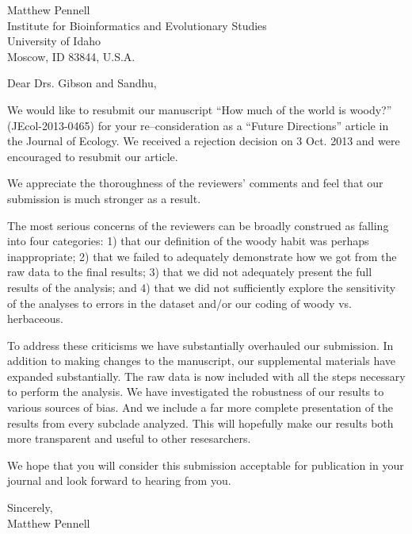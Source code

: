 \documentclass[a4paper,12pt]{article}
\begin{document}
{\raggedleft
  Matthew Pennell\\
  Institute for Bioinformatics and Evolutionary Studies\\
  University of Idaho\\
 Moscow, ID 83844, U.S.A.\\[2ex]
}

\vspace{3ex}

Dear Drs. Gibson and Sandhu,

We would like to resubmit our manuscript ``How much of the world is woody?'' (JEcol-2013-0465) 
for your re--consideration as a ``Future Directions'' article in the Journal of Ecology.
We received a rejection decision on 3 Oct. 2013 and were encouraged to resubmit our article.

We appreciate the thoroughness of the reviewers' comments and feel that our submission is much 
stronger as a result.

The most serious concerns of the reviewers can be broadly construed as falling into four categories:
1) that our definition of the woody habit was perhaps inappropriate; 2) that we failed to adequately
demonstrate how we got from the raw data to the final results; 3) that we did not adequately 
present the full results of the analysis; and 4) that we did not sufficiently explore the sensitivity
of the analyses to errors in the dataset and/or our coding of woody vs. herbaceous.

To address these criticisms we have substantially overhauled our submission. In addition to making changes
to the manuscript, our supplemental materials have expanded substantially. The raw data is now
included with all the steps necessary to perform the analysis. We have investigated the robustness of 
our results to various sources of bias. And we include a far more complete presentation of the results
from every subclade analyzed. This will hopefully make our results both more transparent and useful
to other resesarchers.

We hope that you will consider this submission acceptable for publication in your journal and 
look forward to hearing from you.


\begin{flushright}
\vspace{2ex}
\hspace{.2\textwidth}Sincerely,\\
\hspace*{.3\textwidth}
Matthew Pennell
\end{flushright}
\end{document}
